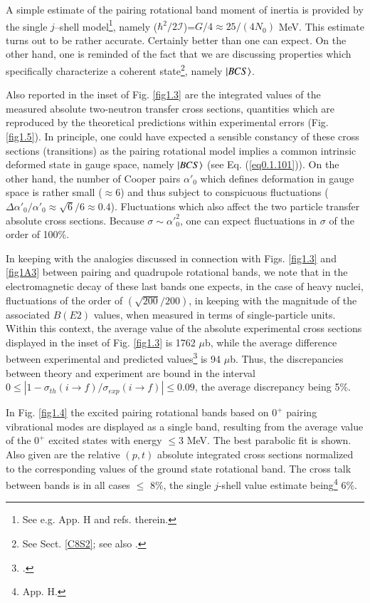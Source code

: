   A simple estimate of the pairing rotational band moment of inertia is provided by the single $j$--shell model\footnote{See e.g. \cite{Brink:05} App. H and refs. therein.}, namely ($\hbar^2/2\mathcal I$)=$G/4\approx25/(4N_0)$ MeV. This estimate turns out to be rather accurate. Certainly better than one can expect. On the other hand, one is reminded of the fact that we are discussing properties which specifically characterize a coherent state\footnote{See  Sect. \ref{C8S2}; see also \cite{Potel:17}.}, namely $|{BCS} \rangle$.
  
  

  Also reported in the inset of Fig. \ref{fig1.3} are the integrated values of the measured absolute two-neutron transfer cross sections, quantities which are reproduced by the theoretical predictions within experimental errors (Fig. \ref{fig1.5}). In principle, one could have expected a sensible constancy of these cross sections (transitions) as the pairing rotational model implies a common intrinsic deformed state in gauge space, namely $|{BCS} \rangle$ (see Eq. (\ref{eq0.1.101})). On the other hand, the number of Cooper pairs $\alpha'_0$ which defines deformation in gauge space is rather small ($\approx6$) and thus subject to conspicuous fluctuations  ($\Delta\alpha'_0/\alpha'_0\approx\sqrt{6}/6\approx 0.4$).  Fluctuations which also affect the  two particle transfer absolute cross sections. Because $\sigma\sim\alpha'^{2}_0$, one can expect fluctuations in $\sigma$ of the order of 100\%.  
  
  In keeping with the analogies discussed in connection with Figs. \ref{fig1.3} and \ref{fig1A3}  between pairing and quadrupole rotational bands, we note that in the electromagnetic decay of these last bands one expects, in the case of heavy nuclei, fluctuations of the order of $(\sqrt{200}/200)$, in keeping with the magnitude of the associated $B(E2)$ values, when measured in terms of single-particle units. Within this context, the average value of the absolute experimental cross sections displayed in the inset of Fig. \ref{fig1.3} is 1762 $\mu$b, while the average difference between experimental and predicted values\footnote{\cite{Potel:13b}.} is 94 $\mu$b. Thus, the discrepancies between theory and experiment are bound in the interval $0\leq|1-\sigma_{th}(i\to f)/\sigma_{exp}(i\to f)|\leq 0.09$, the average discrepancy being 5\%.
  
  
  In Fig. \ref{fig1.4} the excited pairing rotational bands based on $0^+$ pairing vibrational modes are displayed as a single band, resulting from the average  value of the $0^+$ excited states with energy $\leq$3 MeV. The best parabolic fit is shown. Also given are the relative $(p,t)$ absolute integrated cross sections normalized to the corresponding values of the ground state rotational band. The cross talk between bands is in all cases $\leq$ 8\%, the single $j$-shell value estimate being\footnote{\cite{Brink:05} App. H.} 6\%.
  
